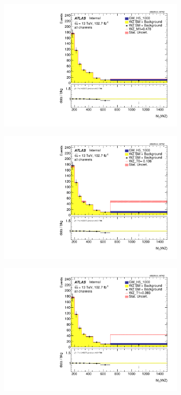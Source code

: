 \documentclass[../Bachelorarbeit.tex]{subfiles}
\begin{document}
\begin{figure}[h]
\begin{subfigure}{0.45\textwidth}
        \includegraphics[width=\textwidth]{Plots/ALL_MTWZ_right_color/GM_H5_1000/M1/2022-05-07/VBSSR/all_VV_MTWZ.pdf}
    \end{subfigure}
    \begin{subfigure}{0.45\textwidth}
        \includegraphics[width=\textwidth]{Plots/ALL_MTWZ_right_color/GM_H5_1000/T0/2022-05-07/VBSSR/all_VV_MTWZ.pdf}
    \end{subfigure}
    \begin{subfigure}{0.45\textwidth}
        \includegraphics[width=\textwidth]{Plots/ALL_MTWZ_right_color/GM_H5_1000/T1/2022-05-07/VBSSR/all_VV_MTWZ.pdf}

\end{subfigure}
\end{figure}
\end{document}

